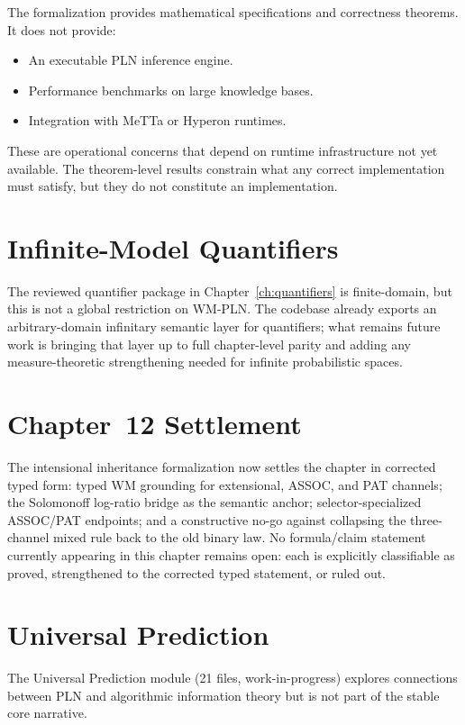 \documentclass[11pt,openany]{report}
\begin{document}
The formalization provides mathematical specifications and correctness
theorems.  It does not provide:
\begin{itemize}
\item An executable PLN inference engine.
\item Performance benchmarks on large knowledge bases.
\item Integration with MeTTa or Hyperon runtimes.
\end{itemize}

These are operational concerns that depend on runtime infrastructure
not yet available.  The theorem-level results constrain what any correct
implementation must satisfy, but they do not constitute an implementation.

\section{Infinite-Model Quantifiers}

The reviewed quantifier package in Chapter~\ref{ch:quantifiers} is
finite-domain, but this is not a global restriction on WM-PLN.  The
codebase already exports an arbitrary-domain infinitary semantic layer
for quantifiers; what remains future work is bringing that layer up to
full chapter-level parity and adding any measure-theoretic strengthening
needed for infinite probabilistic spaces.

\section{Chapter~12 Settlement}

The intensional inheritance formalization now settles the chapter in
corrected typed form: typed WM grounding for extensional, ASSOC, and
PAT channels; the Solomonoff log-ratio bridge as the semantic anchor;
selector-specialized ASSOC/PAT endpoints; and a constructive no-go
against collapsing the three-channel mixed rule back to the old binary
law.  No formula/claim statement currently appearing in this chapter
remains open: each is explicitly classifiable as proved, strengthened to
the corrected typed statement, or ruled out.

\section{Universal Prediction}

The Universal Prediction module (21 files, work-in-progress) explores
connections between PLN and algorithmic information theory but is not
part of the stable core narrative.
\end{document}
